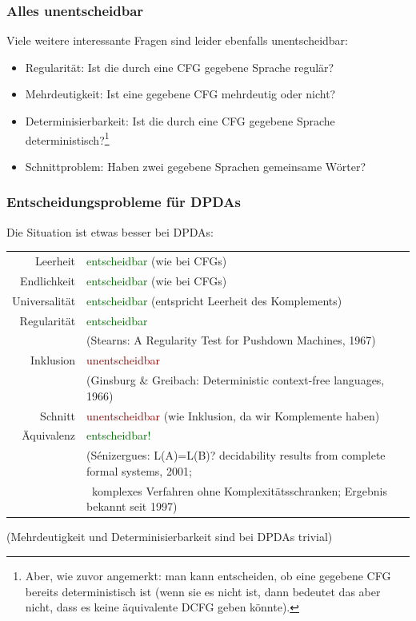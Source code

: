 \documentclass[onlymath]{beamer}
\begin{document}
\begin{frame}\frametitle{Alles unentscheidbar}

Viele weitere interessante Fragen sind leider ebenfalls unentscheidbar:

\begin{itemize}
\item \alert{Regularität:} Ist die durch eine CFG gegebene Sprache regulär?
\item \alert{Mehrdeutigkeit:} Ist eine gegebene CFG mehrdeutig oder nicht?
\item \alert{Determinisierbarkeit:} Ist die durch eine CFG gegebene Sprache deterministisch?\footnote{Aber, wie zuvor angemerkt: man kann entscheiden, ob eine gegebene CFG bereits deterministisch ist
(wenn sie es nicht ist, dann bedeutet das aber nicht, dass es keine äquivalente DCFG geben könnte).}
\item \alert{Schnittproblem:} Haben zwei gegebene Sprachen gemeinsame Wörter?
\end{itemize}


\end{frame}

\begin{frame}\frametitle{Entscheidungsprobleme für DPDAs}

Die Situation ist etwas besser bei DPDAs:
\bigskip

\begin{tabular}{rl}
Leerheit & \textcolor{darkgreen}{entscheidbar} {\tiny(wie bei CFGs)}\\
Endlichkeit & \textcolor{darkgreen}{entscheidbar} {\tiny(wie bei CFGs)} \\\pause
Universalität & \pause\textcolor{darkgreen}{entscheidbar} {\tiny(entspricht Leerheit des Komplements)}\\\pause
Regularität & \textcolor{darkgreen}{entscheidbar}\\[-1.5ex]
	& {\tiny (Stearns: A Regularity Test for Pushdown Machines, 1967)}\pause\\[-1ex]
Inklusion  & \textcolor{darkred}{unentscheidbar}\\[-1.5ex]
	& {\tiny (Ginsburg \& Greibach: Deterministic context-free languages, 1966)}\pause\\[-1ex]
Schnitt & \pause\textcolor{darkred}{unentscheidbar} {\tiny(wie Inklusion, da wir Komplemente haben)}\\\pause
Äquivalenz  \pause& \textcolor{darkgreen}{entscheidbar!}\\[-1.5ex]
	& {\tiny (S\'{e}nizergues: L(A)=L(B)? decidability results from complete formal systems, 2001;}\\[-1.5ex]
	& {\tiny ~komplexes Verfahren ohne Komplexitätsschranken; Ergebnis bekannt seit 1997)}\\[-1ex]
\end{tabular}\bigskip

(Mehrdeutigkeit und Determinisierbarkeit sind bei DPDAs trivial)

\end{frame}
\end{document}
